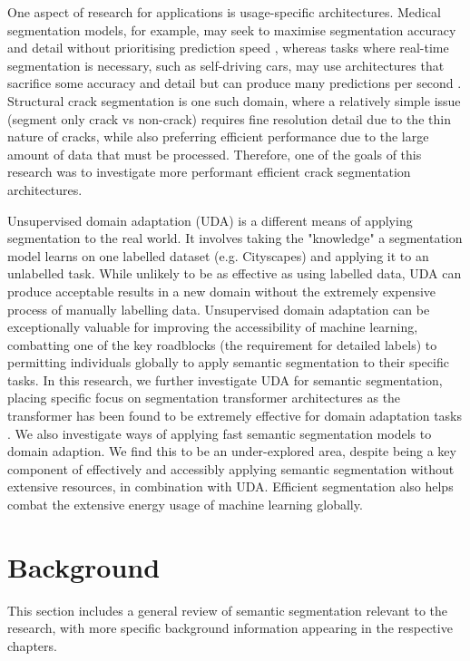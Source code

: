 \documentclass[a4paper,12pt]{report}
\begin{document}
One aspect of research for applications is usage-specific architectures. Medical segmentation models, for example, may seek to maximise segmentation accuracy and detail without prioritising prediction speed \cite{ronneberger_u-net_2015}, whereas tasks where real-time segmentation is necessary, such as self-driving cars, may use architectures that sacrifice some accuracy and detail but can produce many predictions per second \cite{poudel_fast-scnn_2019}. Structural crack segmentation is one such domain, where a relatively simple issue (segment only crack vs non-crack) requires fine resolution detail due to the thin nature of cracks, while also preferring efficient performance due to the large amount of data that must be processed. Therefore, one of the goals of this research was to investigate more performant efficient crack segmentation architectures.

Unsupervised domain adaptation (UDA) is a different means of applying segmentation to the real world. It involves taking the "knowledge" a segmentation model learns on one labelled dataset (e.g. Cityscapes) and applying it to an unlabelled task. While unlikely to be as effective as using labelled data, UDA can produce acceptable results in a new domain without the extremely expensive process of manually labelling data. Unsupervised domain adaptation can be exceptionally valuable for improving the accessibility of machine learning, combatting one of the key roadblocks (the requirement for detailed labels) to permitting individuals globally to apply semantic segmentation to their specific tasks. In this research, we further investigate UDA for semantic segmentation, placing specific focus on segmentation transformer architectures as the transformer has been found to be extremely effective for domain adaptation tasks \cite{yang_tvt_2021} \cite{xu_cdtrans_2021} \cite{hoyer_daformer_2022}. We also investigate ways of applying fast semantic segmentation models to domain adaption. We find this to be an under-explored area, despite being a key component of effectively and accessibly applying semantic segmentation without extensive resources, in combination with UDA. Efficient segmentation also helps combat the extensive energy usage of machine learning globally.


\section{Background}
This section includes a general review of semantic segmentation relevant to the research, with more specific background information appearing in the respective chapters.
\end{document}
